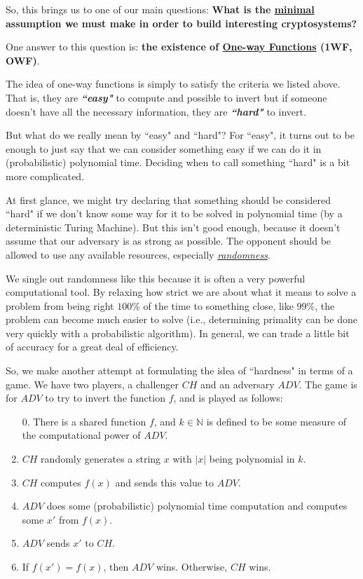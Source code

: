 \documentclass[11pt]{article}
\newcommand{\N}{\mathbb{N}}
\begin{document}
So, this brings us to one of our main questions: \textbf{What is the \underline{minimal} assumption we must make in order to build interesting cryptosystems?}

One answer to this question is: \textbf{the existence of \underline{One-way Functions} (1WF, OWF)}.\bigskip

The idea of one-way functions is simply to satisfy the criteria we listed above. That is, they are \textbf{\emph{``easy"}} to compute and possible to invert but if someone doesn't have all the necessary information, they are \textbf{\emph{``hard"}} to invert.\medskip

But what do we really mean by ``easy" and ``hard"? For ``easy", it turns out to be enough to just say that we can consider something easy if we can do it in (probabilistic) polynomial time. Deciding when to call something ``hard" is a bit more complicated.\smallskip

At first glance, we might try declaring that something should be considered ``hard" if we don't know some way for it to be solved in polynomial time (by a deterministic Turing Machine). But this isn't good enough, because it doesn't assume that our adversary is as strong as possible. The opponent should be allowed to use any available resources, especially \emph{\underline{randomness}}.

We single out randomness like this because it is often a very powerful computational tool. By relaxing how strict we are about what it means to solve a problem from being right \(100\%\) of the time to something close, like \(99\%\), the problem can become much easier to solve (i.e., determining primality can be done very quickly with a probabilistic algorithm). In general, we can trade a little bit of accuracy for a great deal of efficiency.\smallskip

\newpage
So, we make another attempt at formulating the idea of ``hardness" in terms of a game. We have two players, a challenger \(CH\) and an adversary \(ADV\). The game is for \(ADV\) to try to invert the function \(f\), and is played as follows:\medskip

\begin{enumerate}
\item[0.] There is a shared function \(f\), and \(k\in\N\) is defined to be some measure of the computational power of \(ADV\).
\item \(CH\) randomly generates a string \(x\) with \(|x|\) being polynomial in \(k\).
\item \(CH\) computes \(f(x)\) and sends this value to \(ADV\).
\item \(ADV\) does some (probabilistic) polynomial time computation and computes some \(x'\) from \(f(x)\).
\item \(ADV\) sends \(x'\) to \(CH\).
\item If \(f(x')=f(x)\), then \(ADV\) wins. Otherwise, \(CH\) wins.
\end{enumerate}\medskip
\end{document}
